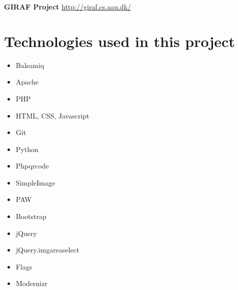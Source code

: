 \textbf{GIRAF Project}
\url{http://giraf.cs.aau.dk/}\\

\section{Technologies used in this project}
\begin{itemize}
\item Balsamiq
\item Apache
\item PHP
\item HTML, CSS, Javascript
\item Git
\item Python
\item Phpqrcode
\item SimpleImage
\item PAW
\item Bootstrap
\item jQuery
\item jQuery.imgareaselect
\item Flags
\item Modernizr
\end{itemize}